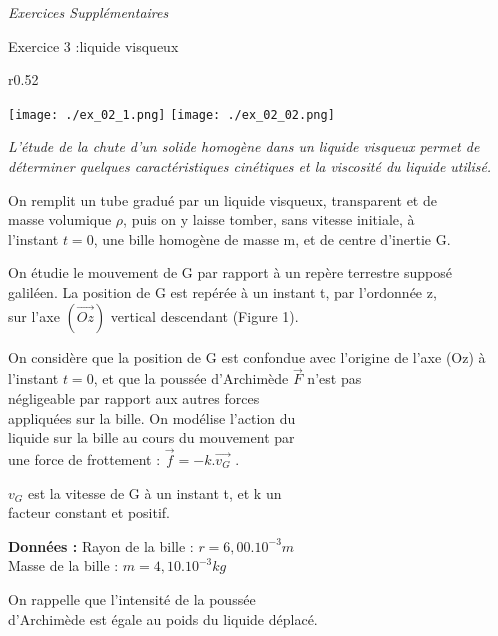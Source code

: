 \documentclass[12pt, french]{article}
\begin{document}
\begin{center}
   \Large{ \em{Exercices Supplémentaires}}
\end{center}


\begin{Box2}{Exercice 3 :liquide visqueux  }
	
	\begin{wrapfigure}[2]{r}{0.52\textwidth}
  \begin{center}
	  \vspace{-0.6cm}
	\texttt{[image: ./ex\_02\_1.png]}
	\texttt{[image: ./ex\_02\_02.png]}
  \end{center}
\end{wrapfigure}


	\emph{L’étude de la chute d’un solide homogène dans un liquide visqueux permet de
déterminer quelques caractéristiques cinétiques et la viscosité du liquide utilisé.}

On remplit un tube gradué par un liquide visqueux, transparent et
de \\masse volumique $\rho$, puis on y laisse tomber, sans vitesse
initiale, à \\l’instant $t = 0$, une bille homogène de masse m, et de
centre d’inertie G.

On étudie le mouvement de G par rapport à un repère terrestre
supposé \\galiléen.
La position de G est repérée à un instant t, par l’ordonnée z, \\sur
l’axe $(\vec{Oz})$ vertical descendant (Figure 1).

On considère que la position de G est confondue avec l’origine de l’axe (Oz) à
l’instant $t = 0$, et que la poussée d’Archimède $\vec{F}$ n’est pas \\négligeable par rapport aux
autres forces \\appliquées sur la bille.
On modélise l’action du \\liquide sur la bille au cours du mouvement par \\une force de
frottement : $\vec{f} = - k.\vec{v_G}$ .

$v_G$ est la vitesse de G à un instant t, et k un \\facteur constant et positif.

\textbf{Données : }  Rayon de la bille : $r = 6,00.10^{-3} m$
 \\Masse de la bille : $m = 4,10.10^{-3}kg$

On rappelle que l’intensité de la poussée \\d’Archimède est égale au poids du liquide
déplacé.


\end{Box2}
\end{document}
